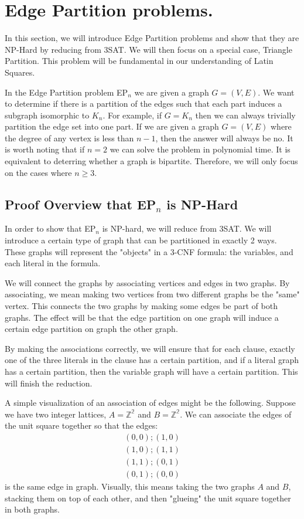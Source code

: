 \documentclass[runningheads,a4paper]{llncs}
\begin{document}
\section{Edge Partition problems.}

In this section, we will introduce Edge Partition problems and show that they are NP-Hard by reducing from 3SAT. We will then focus on a special case, Triangle Partition. This problem will be fundamental in our understanding of Latin Squares. 

In the Edge Partition problem EP$_n$ we are given a graph $G = (V, E)$. We want to determine if there is a partition of the edges such that each part induces a subgraph isomorphic to $K_n$. For example, if $G = K_n$ then we can always trivially partition the edge set into one part. If we are given a graph $G = (V, E)$ where the degree of any vertex is less than $n-1$, then the answer will always be no. It is worth noting that if $n = 2$ we can solve the problem in polynomial time. It is equivalent to deterring whether a graph is bipartite. Therefore, we will only focus on the cases where $n \geq 3$. 

\subsection{Proof Overview that EP$_n$ is NP-Hard}

In order to show that EP$_n$ is NP-hard, we will reduce from 3SAT. We will introduce a certain type of graph that can be partitioned in exactly 2 ways. These graphs will represent the "objects" in a 3-CNF formula: the variables, and each literal in the formula. 

We will connect the graphs by  associating vertices and edges in two graphs. By associating, we mean making two vertices from two different graphs be the "same" vertex. This connects the two graphs by making some edges be part of both graphs. The effect will be that the edge partition on one graph will induce a certain edge partition on graph the other graph. 

By making the associations correctly, we will ensure that for each clause, exactly one of the three literals in the clause has a certain partition, and if a literal graph has a certain partition, then the variable graph will have a certain partition. This will finish the reduction. 

A simple visualization of an association of edges might be the following. Suppose we have two integer lattices, $A = \mathbb{Z^2}$ and $B = \mathbb{Z^2}$. We can associate the edges of the unit square together so that the edges: 
\[ \begin{array}{c} (0,0);(1,0) \\
			     (1, 0); (1, 1) \\
			     (1, 1); (0, 1) \\
			     (0, 1); (0,0) \end{array} \]
  is the same edge in graph. Visually, this means taking the two graphs $A$ and $B$, stacking them on top of each other, and then "glueing" the unit square together in both graphs. 
\end{document}

